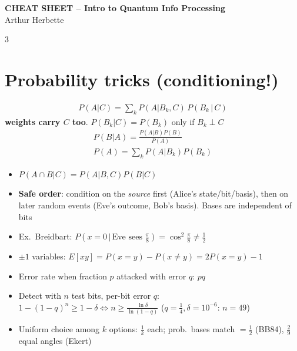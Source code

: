 \documentclass[10pt]{article}
\begin{document}
\begin{center}
    {\small \textbf{CHEAT SHEET -- Intro to Quantum Info Processing}}\\
    {Arthur Herbette}
\end{center}
\newpage
\footnotesize
\begin{multicols*}{3}

\section{Probability tricks (conditioning!)}
	\begin{align*} 
  		P(A|C)=\sum_kP(A|B_k,C)\,P(B_k\,|\,C)
  \end{align*}
 \textbf{weights carry $C$ too}. $P(B_k|C)=P(B_k)$ only if $B_k\perp C$
  \begin{align*} 
	  P(B|A)=\tfrac{P(A|B)P(B)}{P(A)}\\
	  P(A)=\sum_kP(A|B_k)P(B_k)
  \end{align*}
\begin{itemize}
  \item $P(A\cap B|C)=P(A|B,C)P(B|C)$
  \item \textbf{Safe order}: condition on the \emph{source} first (Alice's state/bit/basis), then on later random events (Eve's outcome, Bob's basis). Bases are independent of bits
  \item Ex.\ Breidbart: $P(x=0\,|\,\text{Eve sees }\tfrac\pi8)=\cos^2\tfrac\pi8\neq\tfrac12$
  \item $\pm1$ variables: $E[xy]=P(x{=}y)-P(x{\ne}y)=2P(x{=}y)-1$
  \item Error rate when fraction $p$ attacked with error $q$: $pq$
  \item Detect with $n$ test bits, per-bit error $q$: $1-(1-q)^n\ge1-\delta\iff n\ge\tfrac{\ln\delta}{\ln(1-q)}$ ($q=\tfrac14,\delta=10^{-6}$: $n=49$)
  \item Uniform choice among $k$ options: $\tfrac1k$ each; prob.\ bases match $=\tfrac12$ (BB84), $\tfrac29$ equal angles (Ekert)
\end{itemize}


\end{multicols*}
\end{document}
